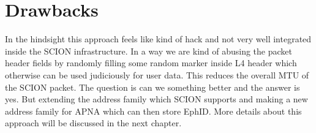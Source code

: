 \section{Drawbacks} \label{overlay:drawback}
In the hindsight this approach feels like kind of hack and not very well integrated inside the SCION infrastructure. In a way we are kind of abusing the packet header fields by randomly filling some random marker inside L4 header which otherwise can be used judiciously for user data. This reduces the overall MTU of the SCION packet. The question is can we something better and the answer is yes. But extending the address family which SCION supports and making a new address family for APNA which can then store EphID. More details about this approach will be discussed in the next chapter.